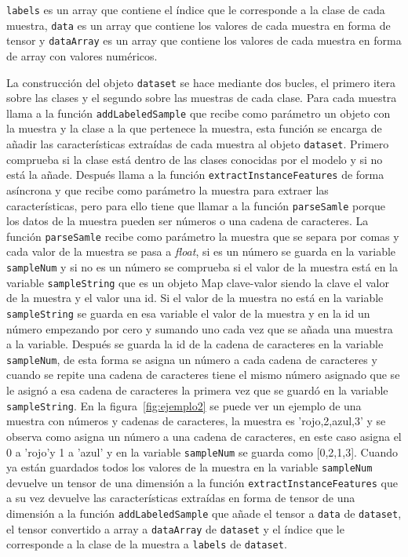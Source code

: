 \documentclass[a4paper, 12pt]{book}
\begin{document}
\texttt{labels} es un array que contiene el índice que le corresponde a la clase de cada muestra, \texttt{data} es un array que contiene los valores de cada muestra en forma de tensor y \texttt{dataArray} es un array que contiene los valores de cada muestra en forma de array con valores numéricos.

La construcción del objeto \texttt{dataset} se hace mediante dos bucles, el primero itera sobre las clases y el segundo sobre las muestras de cada clase. 
Para cada muestra llama a la función \texttt{addLabeledSample} que recibe como parámetro un objeto con la muestra y la clase a la que pertenece la muestra, esta función se encarga de añadir las características extraídas de cada muestra al objeto \texttt{dataset}. 
Primero comprueba si la clase está dentro de las clases conocidas por el modelo y si no está la añade. 
Después llama a la función \texttt{extractInstanceFeatures} de forma asíncrona y que recibe como parámetro la muestra para extraer las características, pero para ello tiene que llamar a la función \texttt{parseSamle} porque los datos de la muestra pueden ser números o una cadena de caracteres. 
La función \texttt{parseSamle} recibe como parámetro la muestra que se separa por comas y cada valor de la muestra se pasa a \emph{float}, si es un número se guarda en la variable \texttt{sampleNum} y si no es un número se comprueba si el valor de la muestra está en la variable \texttt{sampleString} que es un objeto Map clave-valor siendo la clave el valor de la muestra y el valor una id. 
Si el valor de la muestra no está en la variable \texttt{sampleString} se guarda en esa variable el valor de la muestra y en la id un número empezando por cero y sumando uno cada vez que se añada una muestra a la variable. 
Después se guarda la id de la cadena de caracteres en la variable \texttt{sampleNum}, de esta forma se asigna un número a cada cadena de caracteres y cuando se repite una cadena de caracteres tiene el mismo número asignado que se le asignó a esa cadena de caracteres la primera vez que se guardó en la variable \texttt{sampleString}. 
En la figura~\ref{fig:ejemplo2} se puede ver un ejemplo de una muestra con números y cadenas de caracteres, la muestra es 'rojo,2,azul,3' y se observa como asigna un número a una cadena de caracteres, en este caso asigna el 0 a 'rojo'y 1 a 'azul' y en la variable \texttt{sampleNum} se guarda como [0,2,1,3]. 
Cuando ya están guardados todos los valores de la muestra en la variable \texttt{sampleNum} devuelve un tensor de una dimensión a la función \texttt{extractInstanceFeatures} que a su vez devuelve las características extraídas en forma de tensor de una dimensión a la función \texttt{addLabeledSample} que añade el tensor a \texttt{data} de \texttt{dataset}, el tensor convertido a array a \texttt{dataArray} de \texttt{dataset} y el índice que le corresponde a la clase de la muestra a \texttt{labels} de \texttt{dataset}.
\end{document}

